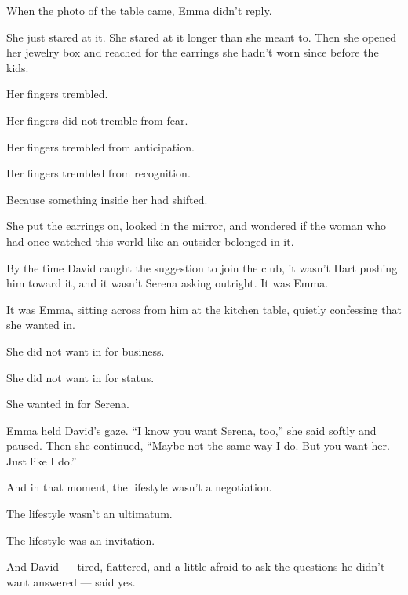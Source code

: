 When the photo of the table came, Emma didn’t reply.

She just stared at it. She stared at it longer than she meant to.
Then she opened her jewelry box and reached for the earrings she hadn’t worn since before the kids.

Her fingers trembled.

Her fingers did not tremble from fear.  

Her fingers trembled from anticipation.

Her fingers trembled from recognition.

Because something inside her had shifted.

She put the earrings on, looked in the mirror, and wondered if the woman who had once watched this world 
like an outsider belonged in it.


By the time David caught the suggestion to join the club, it wasn’t Hart pushing him toward it, and it wasn’t Serena asking 
outright. It was Emma.  

It was Emma, sitting across from him at the kitchen table, quietly confessing that she wanted in.  

She did not want in for business.  

She did not want in for status.  

She wanted in for Serena.

Emma held David's gaze.  ``I know you want Serena, too,'' she said softly and paused.  
Then she continued, ``Maybe not the same way I do. But you want her. Just like I do.''

And in that moment, the lifestyle wasn’t a negotiation.  

The lifestyle wasn’t an ultimatum.  

The lifestyle was an invitation.

And David --- tired, flattered, and a little afraid to ask the questions he didn’t want answered ---  
said yes.

\medskip

